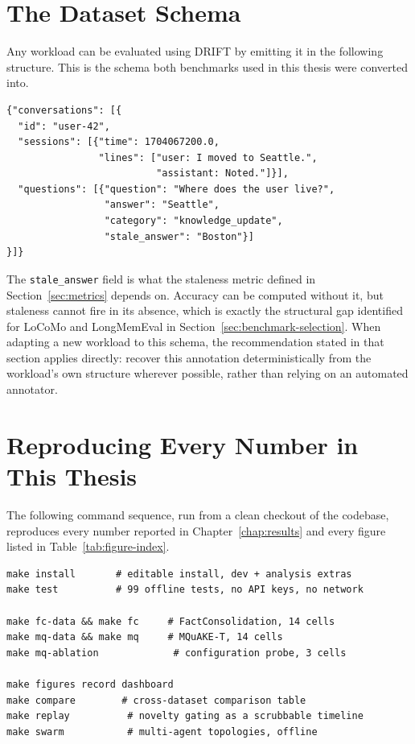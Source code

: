 \section{The Dataset Schema}
\label{sec:appendix-schema}

Any workload can be evaluated using DRIFT by emitting it in the following structure. This is the schema both benchmarks used in this thesis were converted into.

\begin{verbatim}
{"conversations": [{
  "id": "user-42",
  "sessions": [{"time": 1704067200.0,
                "lines": ["user: I moved to Seattle.",
                          "assistant: Noted."]}],
  "questions": [{"question": "Where does the user live?",
                 "answer": "Seattle",
                 "category": "knowledge_update",
                 "stale_answer": "Boston"}]
}]}
\end{verbatim}

The \texttt{stale\_answer} field is what the staleness metric defined in Section~\ref{sec:metrics} depends on. Accuracy can be computed without it, but staleness cannot fire in its absence, which is exactly the structural gap identified for LoCoMo and LongMemEval in Section~\ref{sec:benchmark-selection}. When adapting a new workload to this schema, the recommendation stated in that section applies directly: recover this annotation deterministically from the workload's own structure wherever possible, rather than relying on an automated annotator.

\section{Reproducing Every Number in This Thesis}
\label{sec:reproduction-commands}

The following command sequence, run from a clean checkout of the codebase, reproduces every number reported in Chapter~\ref{chap:results} and every figure listed in Table~\ref{tab:figure-index}.

\begin{verbatim}
make install       # editable install, dev + analysis extras
make test          # 99 offline tests, no API keys, no network

make fc-data && make fc     # FactConsolidation, 14 cells
make mq-data && make mq     # MQuAKE-T, 14 cells
make mq-ablation             # configuration probe, 3 cells

make figures record dashboard
make compare        # cross-dataset comparison table
make replay          # novelty gating as a scrubbable timeline
make swarm           # multi-agent topologies, offline
\end{verbatim}

